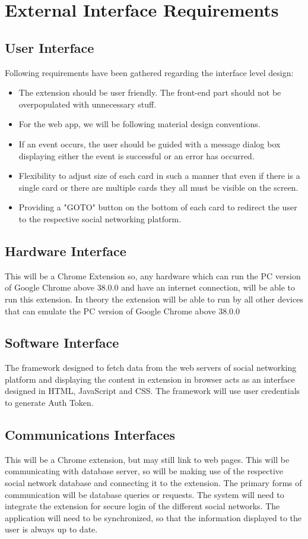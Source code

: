 \documentclass[12pt]{article}
\begin{document}
\section{External Interface Requirements}
\subsection{User Interface}
Following requirements have been gathered regarding the
interface level design:

\begin{itemize}
    \item The extension should be user friendly. The front-end
part should not be overpopulated with unnecessary
stuff.
    \item For the web app, we will be following material design
conventions.
    \item If an event occurs, the user should be guided with a
message dialog box displaying either the event is successful or an error has occurred.
    \item Flexibility to adjust size of each card in such a
manner that even if there is a single card or there
are multiple cards they all must be visible on the
screen.
    \item Providing a {"}GOTO{"} button on the bottom of each card to redirect
the user to the respective social networking platform. 
\end{itemize}

\subsection{Hardware Interface}
This will be a Chrome Extension so, any hardware which
can run the PC version of Google Chrome above 38.0.0 and
have an internet connection, will be able to run this
extension. In theory the extension will be able to run by all
other devices that can emulate the PC version of Google
Chrome above 38.0.0

\subsection{Software Interface}
The framework designed to fetch data from the web servers of social networking platform and displaying the content in extension in browser acts as an interface designed in HTML, JavaScript and CSS. The framework will use user credentials to generate Auth Token.

\subsection{ Communications Interfaces}
This will be a Chrome extension, but may still link to web
pages. This will be communicating with database server, so
will be making use of the respective social network
database and connecting it to the extension. The primary
forms of communication will be database queries or
requests. The system will need to integrate the extension
for secure login of the different social networks. The
application will need to be synchronized, so that the
information displayed to the user is always up to date.
\end{document}

